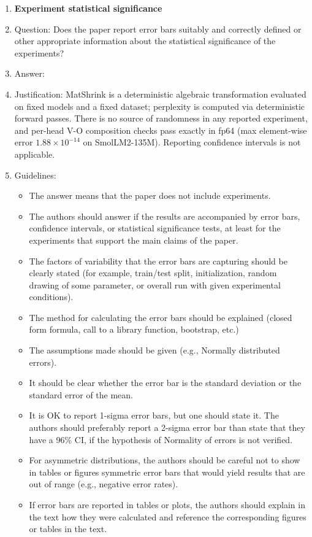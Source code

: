 \begin{enumerate}
\item {\bf Experiment statistical significance}
    \item[] Question: Does the paper report error bars suitably and correctly defined or other appropriate information about the statistical significance of the experiments?
    \item[] Answer: \answerYes{} %
    \item[] Justification: MatShrink is a deterministic algebraic transformation evaluated on fixed models and a fixed dataset; perplexity is computed via deterministic forward passes. There is no source of randomness in any reported experiment, and per-head V-O composition checks pass exactly in fp64 (max element-wise error $1.88 \times 10^{-14}$ on SmolLM2-135M). Reporting confidence intervals is not applicable.
    \item[] Guidelines:
    \begin{itemize}
        \item The answer \answerNA{} means that the paper does not include experiments.
        \item The authors should answer \answerYes{} if the results are accompanied by error bars, confidence intervals, or statistical significance tests, at least for the experiments that support the main claims of the paper.
        \item The factors of variability that the error bars are capturing should be clearly stated (for example, train/test split, initialization, random drawing of some parameter, or overall run with given experimental conditions).
        \item The method for calculating the error bars should be explained (closed form formula, call to a library function, bootstrap, etc.)
        \item The assumptions made should be given (e.g., Normally distributed errors).
        \item It should be clear whether the error bar is the standard deviation or the standard error of the mean.
        \item It is OK to report 1-sigma error bars, but one should state it. The authors should preferably report a 2-sigma error bar than state that they have a 96\% CI, if the hypothesis of Normality of errors is not verified.
        \item For asymmetric distributions, the authors should be careful not to show in tables or figures symmetric error bars that would yield results that are out of range (e.g., negative error rates).
        \item If error bars are reported in tables or plots, the authors should explain in the text how they were calculated and reference the corresponding figures or tables in the text.
    \end{itemize}


\end{enumerate}
